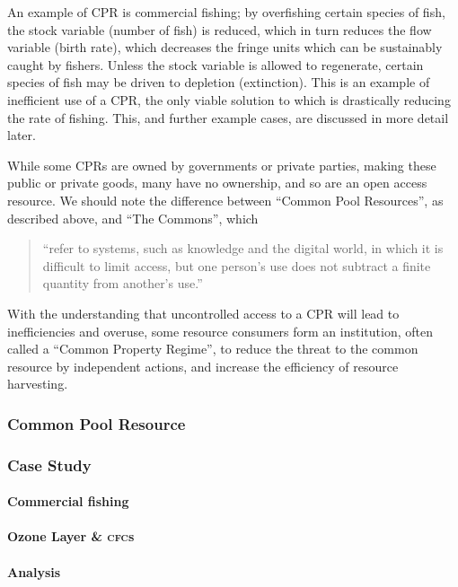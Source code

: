 \documentclass[]{article} %
\begin{document}
An example of CPR is commercial fishing; by overfishing certain species of fish, the stock variable (number of fish) is reduced, which in turn reduces the flow variable (birth rate), which decreases the fringe units which can be sustainably caught by fishers. Unless the stock variable is allowed to regenerate, certain species of fish may be driven to depletion (extinction). This is an example of inefficient use of a CPR, the only viable solution to which is drastically reducing the rate of fishing. This, and further example cases, are discussed in more detail later.

While some CPRs are owned by governments or private parties, making these public or private goods, many have no ownership, and so are an open access resource. We should note the difference between “Common Pool Resources”, as described above, and “The Commons”, which

\begin{quote}
	“refer to systems, such as knowledge and the digital world, in which it is difficult to limit access, but one person’s use does not subtract a finite quantity from another’s use.”~\cite{Ostrom-challenge-90}
\end{quote}

With the understanding that uncontrolled access to a CPR will lead to inefficiencies and overuse, some resource consumers form an institution, often called a “Common Property Regime”, to reduce the threat to the common resource by independent actions, and increase the efficiency of resource harvesting.

\subsubsection{Common Pool Resource}

\subsubsection{Case Study}

\paragraph{Commercial fishing}

\paragraph{Ozone Layer \& \textsc{cfc}s}

\paragraph{Analysis}
\end{document}
